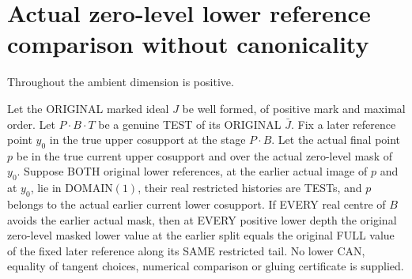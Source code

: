 \section{Actual zero-level lower reference comparison without canonicality}

Throughout the ambient dimension is positive.
\begin{theorem}
\label{hir:original-zero-curve-lower-value-rebase}
\leanok
Let the ORIGINAL marked ideal $J$ be well formed, of positive mark and
maximal order. Let $P\mathbin{\cdot}B\mathbin{\cdot}T$ be a genuine TEST
of its ORIGINAL $\bar J$. Fix a later reference point $y_0$ in the true
upper cosupport at the stage $P\mathbin{\cdot}B$. Let the actual final
point $p$ be in the true current upper cosupport and over the actual
zero-level mask of $y_0$. Suppose BOTH original lower references, at the
earlier actual image of $p$ and at $y_0$, lie in DOMAIN$(1)$, their real
restricted histories are TESTs, and $p$ belongs to the actual earlier
current lower cosupport. If EVERY real centre of $B$ avoids the earlier actual mask,
then at EVERY positive lower depth the original zero-level masked lower
value at the earlier split equals the original FULL value of the fixed
later reference along its SAME restricted tail. No lower CAN, equality of
tangent choices, numerical comparison or gluing certificate is supplied.
\end{theorem}
